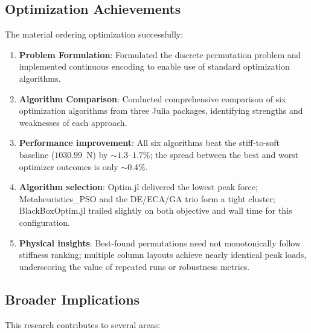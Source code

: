 \documentclass[11pt,a4paper]{article}
\begin{document}
\subsection{Optimization Achievements}

\noindent The material ordering optimization successfully:

\begin{enumerate}
    \item \textbf{Problem Formulation}: Formulated the discrete permutation problem and implemented continuous encoding to enable use of standard optimization algorithms.
    
    \item \textbf{Algorithm Comparison}: Conducted comprehensive comparison of six optimization algorithms from three Julia packages, identifying strengths and weaknesses of each approach.
    
    \item \textbf{Performance improvement}: All six algorithms beat the stiff-to-soft baseline ($1030.99$~N) by $\sim 1.3$--$1.7$\%; the spread between the best and worst optimizer outcomes is only $\sim 0.4$\%.
    
    \item \textbf{Algorithm selection}: Optim.jl delivered the lowest peak force; Metaheuristics\_PSO and the DE/ECA/GA trio form a tight cluster; BlackBoxOptim.jl trailed slightly on both objective and wall time for this configuration.
    
    \item \textbf{Physical insights}: Best-found permutations need not monotonically follow stiffness ranking; multiple column layouts achieve nearly identical peak loads, underscoring the value of repeated runs or robustness metrics.
\end{enumerate}

\subsection{Broader Implications}

\noindent This research contributes to several areas:
\end{document}
